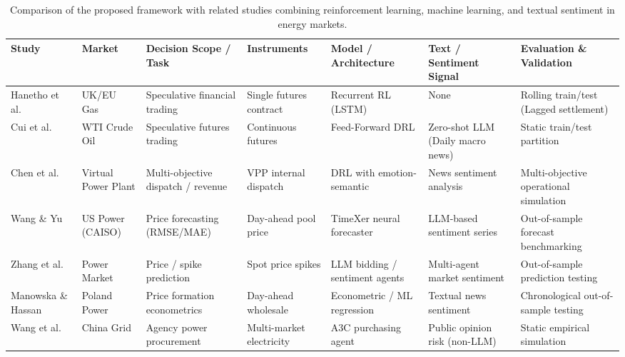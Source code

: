 \begin{table}[!t]
\centering
\footnotesize
\setlength{\tabcolsep}{3.0pt}
\caption{Comparison of the proposed framework with related studies combining reinforcement learning, machine learning, and textual sentiment in energy markets.}
\label{tab:literature_comparison}
\begin{tabularx}{\textwidth}{@{}l >{\hsize=0.85\hsize\raggedright\arraybackslash}X >{\hsize=1.05\hsize\raggedright\arraybackslash}X >{\hsize=0.95\hsize\raggedright\arraybackslash}X >{\hsize=0.95\hsize\raggedright\arraybackslash}X >{\hsize=1.00\hsize\raggedright\arraybackslash}X >{\hsize=1.20\hsize\raggedright\arraybackslash}X@{}}
\toprule
\textbf{Study} & \textbf{Market} & \textbf{Decision Scope / Task} & \textbf{Instruments} & \textbf{Model / Architecture} & \textbf{Text / Sentiment Signal} & \textbf{Evaluation \& Validation} \\
\midrule
Hanetho et al.~\cite{hanetho2023commodities} & UK/EU Gas & Speculative financial trading & Single futures contract & Recurrent RL (LSTM) & None & Rolling train/test (Lagged settlement) \\
Cui et al.~\cite{cui2025toward} & WTI Crude Oil & Speculative futures trading & Continuous futures & Feed-Forward DRL & Zero-shot LLM (Daily macro news) & Static train/test partition \\
Chen et al.~\cite{chen2025modeling} & Virtual Power Plant & Multi-objective dispatch / revenue & VPP internal dispatch & DRL with emotion-semantic & News sentiment analysis & Multi-objective operational simulation \\
Wang \& Yu~\cite{wang2025electricity} & US Power (CAISO) & Price forecasting (RMSE/MAE) & Day-ahead pool price & TimeXer neural forecaster & LLM-based sentiment series & Out-of-sample forecast benchmarking \\
Zhang et al.~\cite{tempr2025llm} & Power Market & Price / spike prediction & Spot price spikes & LLM bidding / sentiment agents & Multi-agent market sentiment & Out-of-sample prediction testing \\
Manowska \& Hassan~\cite{manowska2026modeling} & Poland Power & Price formation econometrics & Day-ahead wholesale & Econometric / ML regression & Textual news sentiment & Chronological out-of-sample testing \\
Wang et al.~\cite{wang2026procurement} & China Grid & Agency power procurement & Multi-market electricity & A3C purchasing agent & Public opinion risk (non-LLM) & Static empirical simulation \\

\end{tabularx}
\end{table}
